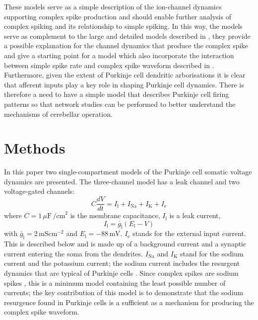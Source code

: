 \documentclass[utf8]{frontiersSCNS} %
\newcommand{\mv}{\,\mathrm{mV}}
\newcommand{\msi}{\,\mathrm{mS cm^{-2}}}
\renewcommand{\k}{\mathrm{K}}
\newcommand{\na}{\mathrm{Na}}
\newcommand{\leak}{\mathrm{l}}
\begin{document}
These models serve as a simple description of the ion-channel dynamics supporting complex spike production and should enable further analysis of complex spiking and its relationship to simple spiking. In this way, the models serve as complement to the large and detailed models described in \cite{VeysEtAl2013,ZangEtAl2018}, they provide a possible explanation for the channel dynamics that produce the complex spike and give a starting point for a model which also incorporate the interaction between simple spike rate and complex spike waveform described in \cite{BurroughsEtAl2016}. Furthermore, given the extent of Purkinje cell dendritic arborisations it is clear that afferent inputs play a key role in shaping Purkinje cell dynamics. There is therefore a need to have a simple model that describes Purkinje cell firing patterns so that network studies can be performed to better understand the mechanisms of cerebellar operation.


\section{Methods}



In this paper two single-compartment models of the Purkinje
cell somatic voltage dynamics are presented. The three-channel model has
a leak channel and two voltage-gated channels:
\begin{equation}
\label{eq:membrane_voltage_3}
C\frac{dV}{dt} =I_\leak+I_{\na}+I_\k+I_{\mathrm{e}}
\end{equation}
where $C = 1\,\mu\mathrm{F}\,\mathrm{\slash cm}^{2}$ is the membrane capacitance,
$I_{\leak}$ is a leak current,
\begin{equation}
\label{eq:I_L}
I_{\leak} =\bar{g}_{\leak}(E_\leak-V)
\end{equation}
with $\bar{g}_{\leak} = 2\msi$ and
$E_{\leak}=-88\mv$. $I_{\mathrm{e}}$ stands for the external input
current. This is described below and is made up of a background
current and a synaptic current entering the soma from the
dendrites. $I_{\na}$ and $I_{\k}$ stand for the sodium current and the
potassium current; the sodium current includes the resurgent dynamics
that are typical of Purkinje cells
\cite{RamanBean1997,RamanBean2001,KhaliqEtAl2003,KhaliqRaman2006}. Since
complex spikes are sodium spikes \cite{StuartHausser1994}, this is a
minimum model containing the least possible number of currents; the
key contribution of this model is to demonstrate that the sodium
resurgence found in Purkinje cells is a sufficient as a mechanism for
producing the complex spike waveform.
\end{document}
